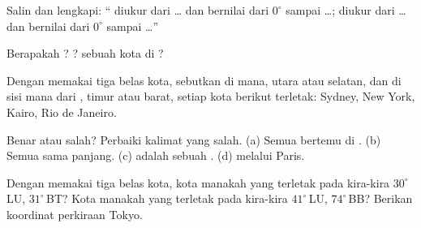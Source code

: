 \begin{exercise}[$\star$]\label{exo:g6:latitude-longitude:1}
Salin dan lengkapi: `` diukur dari \ldots{} dan bernilai dari
$0^\circ$ sampai \ldots;  diukur dari  \ldots{} dan bernilai
dari $0^\circ$ sampai \ldots''
\end{exercise}

\begin{exercise}[$\star$]\label{exo:g6:latitude-longitude:2}
Berapakah  ?  ?  sebuah kota di
?
\end{exercise}

\begin{exercise}[$\star$]\label{exo:g6:latitude-longitude:3}
Dengan memakai  tiga belas kota, sebutkan di  mana, utara
atau selatan, dan di sisi mana dari , timur atau barat,
setiap kota berikut terletak: Sydney, New York, Kairo, Rio de Janeiro.
\end{exercise}

\begin{exercise}[$\star$]\label{exo:g6:latitude-longitude:4}
Benar atau salah? Perbaiki kalimat yang salah.
(a) Semua  bertemu di .
(b) Semua  sama panjang.
(c)  adalah sebuah .
(d)  melalui Paris.
\end{exercise}

\begin{exercise}[$\star\star$]\label{exo:g6:latitude-longitude:5}
Dengan memakai  tiga belas kota, kota manakah yang terletak pada
kira-kira $30^\circ$\,LU, $31^\circ$\,BT? Kota manakah yang terletak pada
kira-kira $41^\circ$\,LU, $74^\circ$\,BB? Berikan koordinat perkiraan Tokyo.
\end{exercise}

